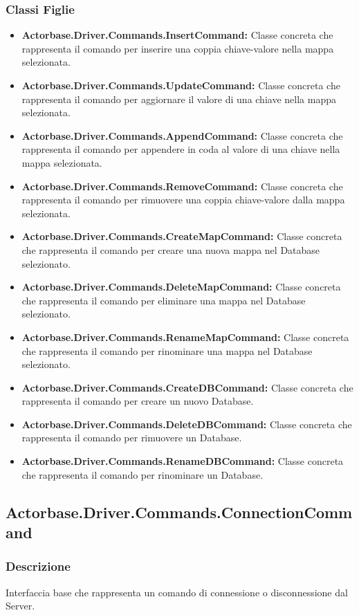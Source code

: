 \documentclass[a4paper]{article}
\begin{document}
			\subsubsection{Classi Figlie}
				\begin{itemize}
					\item \textbf{Actorbase.Driver.Commands.InsertCommand:}
						Classe concreta che rappresenta il comando per inserire una coppia chiave-valore nella mappa selezionata.
					\item \textbf{Actorbase.Driver.Commands.UpdateCommand:}
						Classe concreta che rappresenta il comando per aggiornare il valore di una chiave nella mappa selezionata.
					\item \textbf{Actorbase.Driver.Commands.AppendCommand:}
						Classe concreta che rappresenta il comando per appendere in coda al valore di una chiave nella mappa selezionata.
					\item \textbf{Actorbase.Driver.Commands.RemoveCommand:}
						Classe concreta che rappresenta il comando per rimuovere una coppia chiave-valore dalla mappa selezionata.
					\item \textbf{Actorbase.Driver.Commands.CreateMapCommand:}
						Classe concreta che rappresenta il comando per creare una nuova mappa nel Database selezionato.
					\item \textbf{Actorbase.Driver.Commands.DeleteMapCommand:}
						Classe concreta che rappresenta il comando per eliminare una mappa nel Database selezionato.
					\item \textbf{Actorbase.Driver.Commands.RenameMapCommand:}
						Classe concreta che rappresenta il comando per rinominare una mappa nel Database selezionato.
					\item \textbf{Actorbase.Driver.Commands.CreateDBCommand:}
						Classe concreta che rappresenta il comando per creare un nuovo Database.
					\item \textbf{Actorbase.Driver.Commands.DeleteDBCommand:}
						Classe concreta che rappresenta il comando per rimuovere un Database.
					\item \textbf{Actorbase.Driver.Commands.RenameDBCommand:}
						Classe concreta che rappresenta il comando per rinominare un Database.
				\end{itemize}

		
		\subsection{Actorbase.Driver.Commands.ConnectionCommand}
			\subsubsection{Descrizione} Interfaccia base che rappresenta un comando di connessione o disconnessione dal Server.
\end{document}
